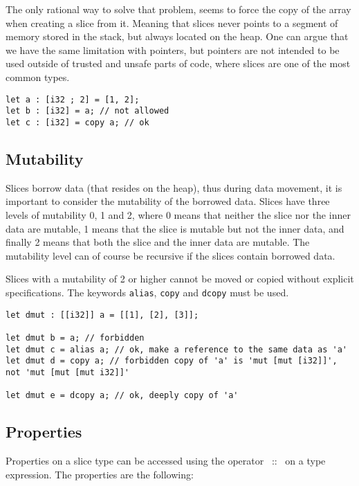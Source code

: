 The only rational way to solve that problem, seems to force the copy of the
array when creating a slice from it. Meaning that slices never points to a
segment of memory stored in the stack, but always located on the heap. One can
argue that we have the same limitation with pointers, but pointers are not
intended to be used outside of trusted and unsafe parts of code, where slices
are one of the most common types.

\begin{lstlisting}[style=coloredverbatim]
let a : [i32 ; 2] = [1, 2];
let b : [i32] = a; // not allowed
let c : [i32] = copy a; // ok
\end{lstlisting}

\subsection {Mutability}

Slices borrow data (that resides on the heap), thus during data movement, it is
important to consider the mutability of the borrowed data. Slices have three
levels of mutability 0, 1 and 2, where 0 means that neither the slice nor the
inner data are mutable, 1 means that the slice is mutable but not the inner
data, and finally 2 means that both the slice and the inner data are mutable.
The mutability level can of course be recursive if the slices contain borrowed
data.

Slices with a mutability of 2 or higher cannot be moved or copied without
explicit specifications. The keywords \texttt{alias}, \texttt{copy} and
\texttt{dcopy} must be used.

\begin{lstlisting}[style=coloredverbatim]
let dmut : [[i32]] a = [[1], [2], [3]];

let dmut b = a; // forbidden
let dmut c = alias a; // ok, make a reference to the same data as 'a'
let dmut d = copy a; // forbidden copy of 'a' is 'mut [mut [i32]]', not 'mut [mut [mut i32]]'

let dmut e = dcopy a; // ok, deeply copy of 'a'
\end{lstlisting}

\subsection {Properties}

Properties on a slice type can be accessed using the operator ~::~ on a type
expression. The properties are the following:

